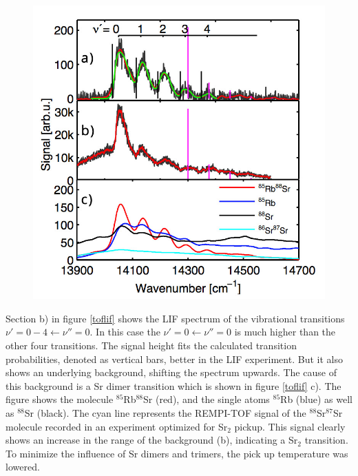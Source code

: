 \documentclass[parskip,12pt,headsepline,a4paper] {scrbook}
\begin{document}
\begin{figure}[ht]
\centerline{
\includegraphics[width=13cm]{./resultsRbSr/liftof.jpg}}
\end{figure}

Section b) in figure \ref{toflif} shows the LIF spectrum of the vibrational transitions $\nu'=0-4 \leftarrow \nu''=0$. In this case the $\nu'=0 \leftarrow \nu''=0$ is much higher than the other four transitions. The signal height fits the calculated transition probabilities, denoted as vertical bars, better in the LIF experiment. But it also shows an underlying background, shifting the spectrum upwards. The cause of this background is a Sr dimer transition which is shown in figure \ref{toflif} c). The figure shows the molecule $^{85}$Rb$^{88}$Sr (red), and the single atoms $^{85}$Rb (blue) as well as $^{88}$Sr (black). The cyan line represents the REMPI-TOF signal of the $^{88}$Sr$^{87}$Sr molecule recorded in an experiment optimized for Sr$_2$ pickup. This signal clearly shows an increase in the range of the background (b), indicating a Sr$_2$ transition. To minimize the influence of Sr dimers and trimers, the pick up temperature was lowered.
\end{document}
